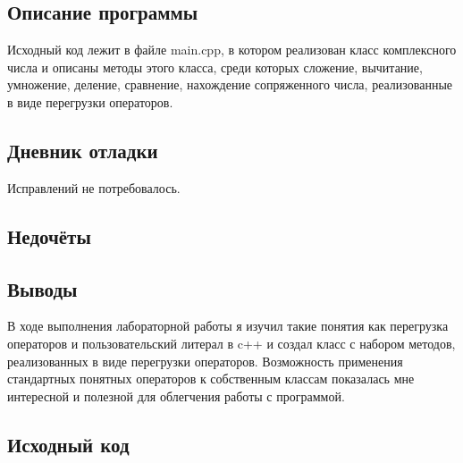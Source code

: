 \documentclass[12pt]{article}
\begin{document}
\subsection*{Описание программы}

Исходный код лежит в файле main.cpp, в котором реализован класс комплексного числа и описаны методы этого класса, среди которых сложение, вычитание, умножение, деление, сравнение, нахождение сопряженного числа, реализованные в виде перегрузки операторов.

\subsection*{Дневник отладки}
Исправлений не потребовалось.


\subsection*{Недочёты}


\subsection*{Выводы}
В ходе выполнения лабораторной работы я изучил такие понятия как перегрузка операторов и пользовательский литерал в c++ и создал класс с набором методов, реализованных в виде перегрузки операторов. Возможность применения стандартных понятных операторов к собственным классам показалась мне интересной и полезной для облегчения работы с программой.


\vfill

\subsection*{Исходный код}
\end{document}
